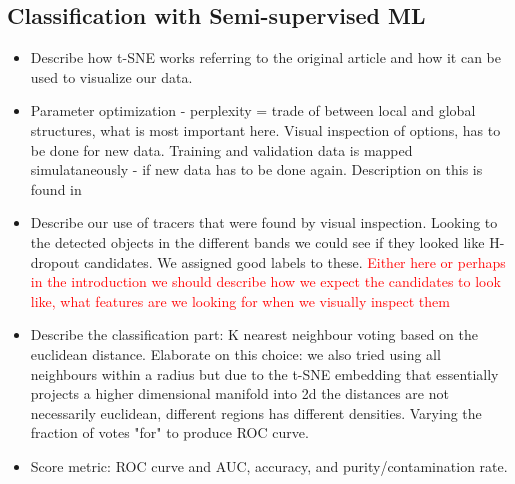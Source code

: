 \subsection{Classification with Semi-supervised ML}
\begin{itemize}
    \item Describe how t-SNE works referring to the original article \cite{Maaten_2008_tSNE} and how it can be used to visualize our data.
    \item Parameter optimization - perplexity = trade of between local and global structures, what is most important here. Visual inspection of options, has to be done for new data. Training and validation data is mapped simulataneously - if new data has to be done again. Description on this is found in \cite{Steinhardt_2020}
    \item Describe our use of tracers that were found by visual inspection. Looking to the detected objects in the different bands we could see if they looked like H-dropout candidates. We assigned good labels to these. \textcolor{red}{Either here or perhaps in the introduction we should describe how we expect the candidates to look like, what features are we looking for when we visually inspect them}
    \item Describe the classification part: K nearest neighbour voting based on the euclidean distance. Elaborate on this choice: we also tried using all neighbours within a radius but due to the t-SNE embedding that essentially projects a higher dimensional manifold into 2d the distances are not necessarily euclidean, different regions has different densities. Varying the fraction of votes "for" to produce ROC curve.
    \item Score metric: ROC curve and AUC, accuracy, and purity/contamination rate.
\end{itemize}